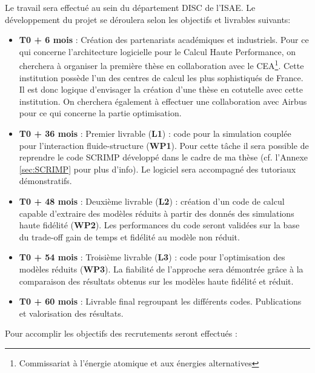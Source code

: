 \documentclass[12pt, french]{article}
\begin{document}
	Le travail sera effectué au sein du département DISC de l'ISAE. Le développement du projet se déroulera selon les objectifs et livrables suivants:
	\begin{itemize}
		\item \textbf{T0 + 6 mois} : Création des partenariats académiques et industriels.
		Pour ce qui concerne l'architecture logicielle pour le Calcul Haute Performance, on cherchera à organiser la première thèse en collaboration avec le CEA\footnote{Commissariat à l'énergie atomique et aux énergies alternatives}. Cette institution possède l'un des centres de calcul les plus sophistiqués de France. Il est donc logique d'envisager la création d'une thèse en cotutelle avec cette institution. On cherchera également à effectuer une collaboration avec Airbus pour ce qui concerne la partie optimisation.
		\item \textbf{T0 + 36 mois} : Premier livrable (\textbf{L1}) : code pour la simulation couplée pour l'interaction fluide-structure (\textbf{WP1}). Pour cette t\^ache il sera possible de reprendre le code SCRIMP développé dans le cadre de ma thèse (cf. l'Annexe \ref{sec:SCRIMP} pour plus d'info). Le logiciel sera accompagné des tutoriaux démonstratifs.
		\item \textbf{T0 + 48 mois} : Deuxième livrable (\textbf{L2}) : création d'un code de calcul capable d'extraire des modèles réduits à partir des donnés des simulations haute fidélité (\textbf{WP2}). Les performances du code seront validées sur la base du trade-off gain de temps et fidélité au modèle non réduit.
		\item \textbf{T0 + 54 mois} : Troisième livrable (\textbf{L3}) : code pour l'optimisation des modèles réduits (\textbf{WP3}). La fiabilité de l'approche sera démontrée grâce à la comparaison des résultats obtenus sur les modèles haute fidélité et réduit. 
		\item \textbf{T0 + 60 mois} : Livrable final regroupant les différents codes. 		Publications et valorisation des résultats. 
	\end{itemize} 
Pour accomplir les objectifs des recrutements seront effectués :
\end{document}
